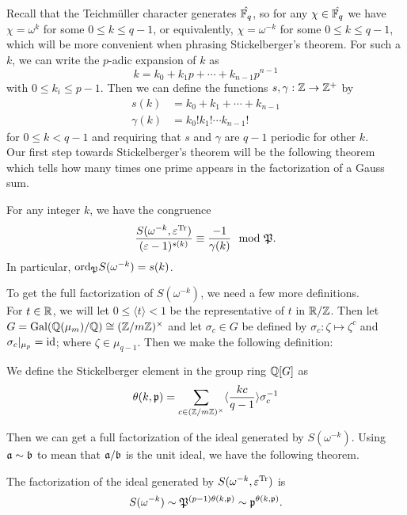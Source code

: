 Recall that the Teichm\"uller character generates $\hat{\mathbb{F}_q}$, so for any $\chi \in \hat{\mathbb{F}_q}$ we have $\chi = \omega^k$ for some $0 \leq k \leq q-1$, or equivalently, $\chi = \omega^{-k}$ for some $0 \leq k \leq q-1$, which will be more convenient when phrasing Stickelberger's theorem.
For such a $k$, we can write the $p$-adic expansion of $k$ as
\[k = k_0 + k_1 p + \cdots + k_{n-1}p^{n-1}\]
with $0 \leq k_i \leq p-1$. Then we can define the functions $s, \gamma : \mathbb{Z} \to \mathbb{Z}^+$ by 
\begin{align*}
s(k) &= k_0 + k_1 + \cdots + k_{n-1} \\
\gamma(k) &= k_0! k_1!  \cdots  k_{n-1}!
\end{align*}
for $0 \leq k < q-1$ and requiring that $s$ and $\gamma$ are $q-1$ periodic for other $k$.
\\

Our first step towards Stickelberger's theorem will be the following theorem which tells how many times one prime appears in the factorization of a Gauss sum.
\begin{theorem}\label{thm:Stickelberger}
For any integer $k$, we have the congruence 
\[\frac{S(\omega^{-k}, \varepsilon^{\textrm{Tr}})}{(\varepsilon - 1)^{s(k)}} \equiv \frac{-1}{\gamma(k)} \mod {\mathfrak{P}}.\]
In particular, $\textrm{ord}_{\mathfrak{P}} S(\omega^{-k}) = s(k)$.
\end{theorem}
To get the full factorization of $S(\omega^{-k})$, we need a few more definitions.\\

For $t \in \mathbb{R}$, we will let $0 \leq \langle t \rangle < 1$ be the representative of $t$ in $ \mathbb{R} / \mathbb{Z}$. 
Then let $G = \textrm{Gal}(\mathbb{Q}(\mu_m)/\mathbb{Q}) \cong (\mathbb{Z} / m\mathbb{Z})^\times$ and let $\sigma_c \in G$ be defined by $\sigma_c : \zeta \mapsto \zeta^c$ and $\sigma_c|_{\mu_p}  = \textrm{id}$; where $\zeta \in \mu_{q-1}$.
Then we make the following definition: 
\begin{defn}
We define the Stickelberger element in the group ring $\mathbb{Q}[G]$ as 
\[\theta(k,\mathfrak{p}) = \sum_{c \in (\mathbb{Z}/m\mathbb{Z})^\times} \langle \frac{kc}{q-1}\rangle \sigma_c^{-1}\]
\end{defn}
Then we can get a full factorization of the ideal generated by $S(\omega^{-k})$. Using $\mathfrak{a} \sim \mathfrak{b}$ to mean that $\mathfrak{a} / \mathfrak{b}$ is the unit ideal, we have the following theorem.
\begin{theorem}
The factorization of the ideal generated by $S(\omega^{-k}, \varepsilon^{\textrm{Tr}})$ is \[S(\omega^{-k}) \sim \mathfrak{P}^{(p-1)\theta(k, \mathfrak{p})} \sim \mathfrak{p}^{\theta(k,\mathfrak{p})}.\]
\end{theorem}



